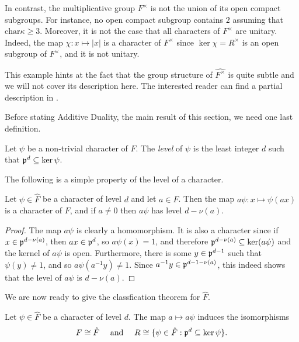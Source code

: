 \begin{example}
    In contrast, the multiplicative group $F^\times$ is not the union of its open compact subgroups. For instance, no open compact subgroup contains $2$ assuming that $\mathrm{char}\kappa\geq 3$. Moreover, it is not the case that all characters of $F^\times$ are unitary. Indeed, the map $\chi:x\mapsto|x|$ is a character of $F^{\times}$ since $\ker\chi=R^\times$ is an open subgroup of $F^\times$, and it is not unitary.

    This example hints at the fact that the group structure of $\hat{F^\times}$ is quite subtle and we will not cover its description here. The interested reader can find a partial description in \cite[\S 1.8]{BH1}.
\end{example}


Before stating Additive Duality, the main result of this section, we need one last definition.

\begin{defn}\label{def:addlevel}
    Let $\psi$ be a non-trivial character of $F$. The \textit{level} of $\psi$ is the least integer $d$ such that $\mathfrak{p}^d\subseteq\ker\psi$.
\end{defn}

The following is a simple property of the level of a character.

\begin{lemma}
    Let $\psi\in\hat{F}$ be a character of level $d$ and let $a\in F$. Then the map $a\psi:x\mapsto\psi(ax)$ is a character of $F$, and if $a\neq0$ then $a\psi$ has level $d-\nu(a)$.
\end{lemma}
\begin{proof}
    The map $a\psi$ is clearly a homomorphism. It is also a character since if $x\in\mathfrak{p}^{d-\nu(a)}$, then $ax\in\mathfrak{p}^d$, so $a\psi(x)=1$, and therefore $\mathfrak{p}^{d-\nu(a)}\subseteq\ker(a\psi)$ and the kernel of $a\psi$ is open. Furthermore, there is some $y\in\mathfrak{p}^{d-1}$ such that $\psi(y)\neq1$, and so $a\psi(a^{-1}y)\neq1$. Since $a^{-1}y\in\mathfrak{p}^{d-1-\nu(a)}$, this indeed shows that the level of $a\psi$ is $d-\nu(a)$. 
\end{proof}

We are now ready to give the classfication theorem for $\hat{F}$.

\begin{thm}\label{add_dual}
    Let $\psi\in\hat{F}$ be a character of level $d$. The map $a\mapsto a\psi$ induces the isomorphisms 
    $$F\cong\hat{F} \quad\text{ and }\quad R\cong\{\psi\in\hat{F}:\mathfrak{p}^d\subseteq\ker\psi\}.$$  
\end{thm}

